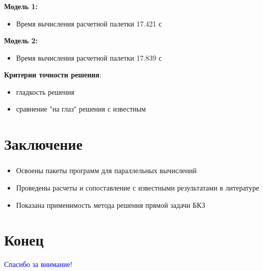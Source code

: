 \begin{frame}
\frametitle{\insertsection}

\textbf{Модель 1:}
\begin{itemize}
    \item Время вычисления расчетной палетки 17.421 с
\end{itemize}
\bigskip

\textbf{Модель 2:}
\begin{itemize}
    \item Время вычисления расчетной палетки 17.839 с
\end{itemize}
\bigskip

\textbf{Критерии точности решения}:
\begin{itemize}
    \item гладкость решения
    \item сравнение "на глаз" решения с известным
\end{itemize}
\end{frame}


\section{Заключение}

\begin{frame}
\frametitle{\insertsection}

\begin{itemize}
    \item Освоены пакеты программ для параллельных вычислений
    \item Проведены расчеты и сопоставление с известными результатами в литературе
    \item Показана применимость метода решения прямой задачи БКЗ
\end{itemize}
\end{frame}


\section{Конец}

\begin{frame}
\centering
\vfill
\textcolor{Blue}{\Large Спасибо за внимание!}
\vfill
\end{frame}